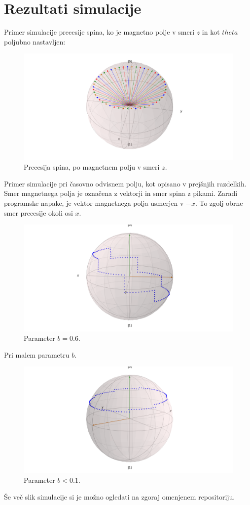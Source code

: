 \documentclass[12pt, a4paper]{article}
\begin{document}
\section{Rezultati simulacije}
Primer simulacije precesije spina, ko je magnetno polje v smeri $z$ in kot $theta$ poljubno nastavljen:
\begin{figure}[H]
  \includegraphics[width=400pt]{slike/precesija_po_osi_z.png}
  \caption{Precesija spina, po magnetnem polju v smeri $z$.}
  \label{fig:boat1}
\end{figure}
Primer simulacije pri časovno odvisnem polju, kot opisano v prejšnjih razdelkih. Smer magnetnega polja je označena z vektorji in smer spina z pikami. Zaradi programske napake, je vektor magnetnega polja usmerjen v $-x$. To zgolj obrne smer precesije okoli osi $x$.
\begin{figure}[H]
	\includegraphics[width=400pt]{slike/b=06.png}
	\caption{Parameter $b = 0.6$.}
	\label{fig:boat1}
\end{figure}
Pri malem parametru $b$.
\begin{figure}[H]
	\includegraphics[width=400pt]{slike/precesija_v_cas}
	\caption{Parameter $b < 0.1$.}
	\label{fig:boat1}
  \end{figure}
Še več slik simulacije si je možno ogledati na zgoraj omenjenem repositoriju.
\end{document}
